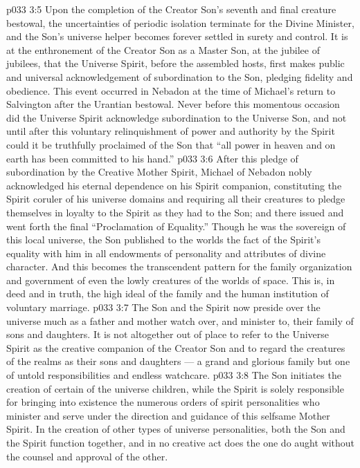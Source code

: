 \vs p033 3:5 Upon the completion of the Creator Son’s seventh and final creature bestowal, the uncertainties of periodic isolation terminate for the Divine Minister, and the Son’s universe helper becomes forever settled in surety and control. It is at the enthronement of the Creator Son as a Master Son, at the jubilee of jubilees, that the Universe Spirit, before the assembled hosts, first makes public and universal acknowledgement of subordination to the Son, pledging fidelity and obedience. This event occurred in Nebadon at the time of Michael’s return to Salvington after the Urantian bestowal. Never before this momentous occasion did the Universe Spirit acknowledge subordination to the Universe Son, and not until after this voluntary relinquishment of power and authority by the Spirit could it be truthfully proclaimed of the Son that “all power in heaven and on earth has been committed to his hand.”
\vs p033 3:6 After this pledge of subordination by the Creative Mother Spirit, Michael of Nebadon nobly acknowledged his eternal dependence on his Spirit companion, constituting the Spirit coruler of his universe domains and requiring all their creatures to pledge themselves in loyalty to the Spirit as they had to the Son; and there issued and went forth the final “Proclamation of Equality.” Though he was the sovereign of this local universe, the Son published to the worlds the fact of the Spirit’s equality with him in all endowments of personality and attributes of divine character. And this becomes the transcendent pattern for the family organization and government of even the lowly creatures of the worlds of space. This is, in deed and in truth, the high ideal of the family and the human institution of voluntary marriage.
\vs p033 3:7 The Son and the Spirit now preside over the universe much as a father and mother watch over, and minister to, their family of sons and daughters. It is not altogether out of place to refer to the Universe Spirit as the creative companion of the Creator Son and to regard the creatures of the realms as their sons and daughters --- a grand and glorious family but one of untold responsibilities and endless watchcare.
\vs p033 3:8 \pc The Son initiates the creation of certain of the universe children, while the Spirit is solely responsible for bringing into existence the numerous orders of spirit personalities who minister and serve under the direction and guidance of this selfsame Mother Spirit. In the creation of other types of universe personalities, both the Son and the Spirit function together, and in no creative act does the one do aught without the counsel and approval of the other.
